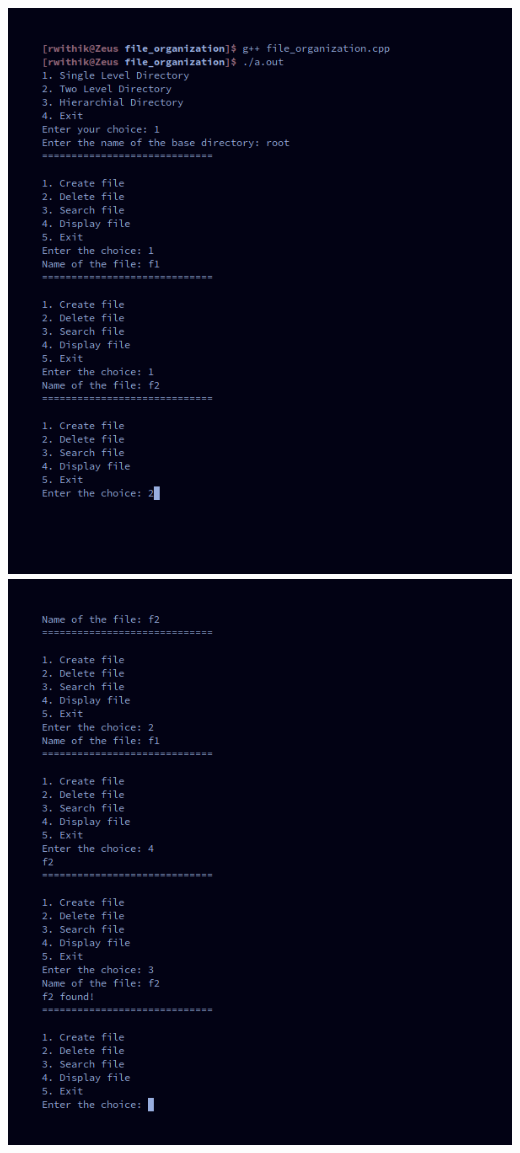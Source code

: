 \documentclass[10pt,a4paper,titlepage]{report}
\begin{document}
{\includegraphics[width=\linewidth]{../Images/file_organization/1.png}\newline
\includegraphics[width=\linewidth]{../Images/file_organization/2.png}\newline
}
\end{document}
